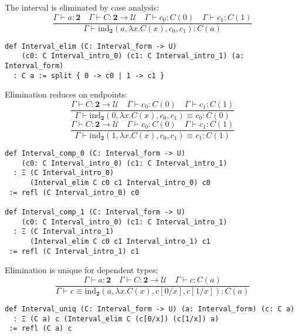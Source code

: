 \documentclass{article}
\begin{document}
\begin{definition}
The interval is eliminated by case analysis:
\[
\frac{\Gamma \vdash a : \mathbf{2} \quad \Gamma \vdash C : \mathbf{2} \to \mathcal{U} \quad \Gamma \vdash c_0 : C(0) \quad \Gamma \vdash c_1 : C(1)}{\Gamma \vdash \text{ind}_{\mathbf{2}}(a, \lambda x . C(x), c_0, c_1) : C(a)}
\]
\begin{lstlisting}[mathescape=true]
def Interval_elim (C: Interval_form -> U)
    (c0: C Interval_intro_0) (c1: C Interval_intro_1) (a: Interval_form)
  : C a := split { 0 -> c0 | 1 -> c1 }
\end{lstlisting}
\end{definition}

\begin{theorem}
Elimination reduces on endpoints:
\[
\frac{\Gamma \vdash C : \mathbf{2} \to \mathcal{U} \quad \Gamma \vdash c_0 : C(0) \quad \Gamma \vdash c_1 : C(1)}{\Gamma \vdash \text{ind}_{\mathbf{2}}(0, \lambda x . C(x), c_0, c_1) \equiv c_0 : C(0)}
\]
\[
\frac{\Gamma \vdash C : \mathbf{2} \to \mathcal{U} \quad \Gamma \vdash c_0 : C(0) \quad \Gamma \vdash c_1 : C(1)}{\Gamma \vdash \text{ind}_{\mathbf{2}}(1, \lambda x . C(x), c_0, c_1) \equiv c_1 : C(1)}
\]
\begin{lstlisting}[mathescape=true]
def Interval_comp_0 (C: Interval_form -> U)
    (c0: C Interval_intro_0) (c1: C Interval_intro_1)
  : Ξ (C Interval_intro_0)
      (Interval_elim C c0 c1 Interval_intro_0) c0
 := refl (C Interval_intro_0) c0

def Interval_comp_1 (C: Interval_form -> U)
    (c0: C Interval_intro_0) (c1: C Interval_intro_1)
  : Ξ (C Interval_intro_1)
      (Interval_elim C c0 c1 Interval_intro_1) c1
 := refl (C Interval_intro_1) c1
\end{lstlisting}
\end{theorem}

\begin{theorem}
Elimination is unique for dependent types:
\[
\frac{\Gamma \vdash a : \mathbf{2} \quad \Gamma \vdash C : \mathbf{2} \to \mathcal{U} \quad \Gamma \vdash c : C(a)}{\Gamma \vdash c \equiv \text{ind}_{\mathbf{2}}(a, \lambda x . C(x), c[0/x], c[1/x]) : C(a)}
\]
\begin{lstlisting}[mathescape=true]
def Interval_uniq (C: Interval_form -> U) (a: Interval_form) (c: C a)
  : Ξ (C a) c (Interval_elim C (c[0/x]) (c[1/x]) a)
 := refl (C a) c
\end{lstlisting}
\end{theorem}
\end{document}
